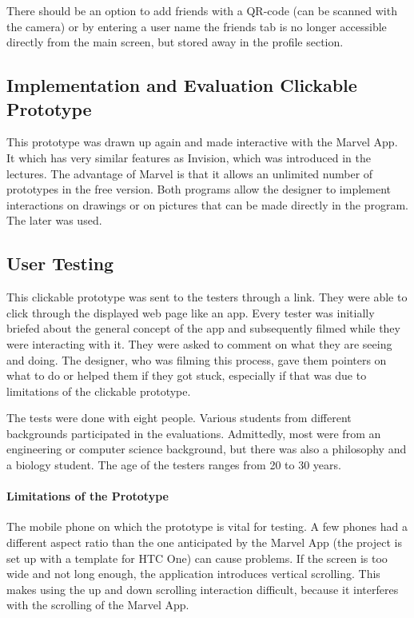 \documentclass[10pt,twocolumn]{article} %
\begin{document}
There should be an option to add friends with a QR-code (can be scanned with the camera) or by entering a user name the friends tab is no longer accessible directly from the main screen, but stored away in the profile section. 

\subsection*{Implementation and Evaluation Clickable Prototype}
This prototype was drawn up again and made interactive with the Marvel App. It which has very similar features as Invision, which was introduced in the lectures. The advantage of Marvel is that it allows an unlimited number of prototypes in the free version. Both programs allow the designer to implement interactions on drawings or on pictures that can be made directly in the program. The later was used.


\subsection*{User Testing}

This clickable prototype was sent to the testers through a link. They were  able to click through the displayed web page like an app. Every tester was initially briefed about the general concept of the app and subsequently filmed while they were interacting with it. They were asked to comment on what they are seeing and doing. The designer, who was filming this process, gave them pointers on what to do or helped them if they got stuck, especially if that was due to limitations of the clickable prototype. 

The tests were done with eight people. Various students from different backgrounds participated in the evaluations. Admittedly, most were from an engineering or computer science background, but there was also a philosophy and a biology student. The age of the testers ranges from 20 to 30 years. 

\paragraph{Limitations of the Prototype}
The mobile phone on which the prototype is vital for testing. A few phones had a different aspect ratio than the one anticipated by the Marvel App (the project is set up with a template for HTC One) can cause problems. If the screen is too wide and not long enough, the application introduces vertical scrolling. This makes using the up and down scrolling interaction difficult, because it interferes with the scrolling of the Marvel App.
\end{document}

